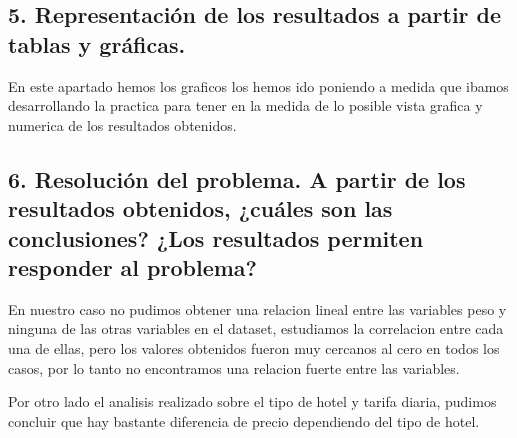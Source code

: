 \documentclass[]{article}
\begin{document}
\hypertarget{representaciuxf3n-de-los-resultados-a-partir-de-tablas-y-gruxe1ficas.}{%
\subsection{5. Representación de los resultados a partir de tablas y
gráficas.}\label{representaciuxf3n-de-los-resultados-a-partir-de-tablas-y-gruxe1ficas.}}

En este apartado hemos los graficos los hemos ido poniendo a medida que
ibamos desarrollando la practica para tener en la medida de lo posible
vista grafica y numerica de los resultados obtenidos.

\hypertarget{resoluciuxf3n-del-problema.-a-partir-de-los-resultados-obtenidos-cuuxe1les-son-las-conclusiones-los-resultados-permiten-responder-al-problema}{%
\subsection{6. Resolución del problema. A partir de los resultados
obtenidos, ¿cuáles son las conclusiones? ¿Los resultados permiten
responder al
problema?}\label{resoluciuxf3n-del-problema.-a-partir-de-los-resultados-obtenidos-cuuxe1les-son-las-conclusiones-los-resultados-permiten-responder-al-problema}}

En nuestro caso no pudimos obtener una relacion lineal entre las
variables peso y ninguna de las otras variables en el dataset,
estudiamos la correlacion entre cada una de ellas, pero los valores
obtenidos fueron muy cercanos al cero en todos los casos, por lo tanto
no encontramos una relacion fuerte entre las variables.

Por otro lado el analisis realizado sobre el tipo de hotel y tarifa
diaria, pudimos concluir que hay bastante diferencia de precio
dependiendo del tipo de hotel.
\end{document}
